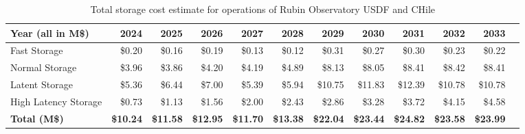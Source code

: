 \tiny \begin{longtable} { |p{}  |r  |r  |r  |r  |r  |r  |r  |r  |r  |r  |r |} 
\caption{Total storage cost estimate for operations of Rubin Observatory USDF and CHile \label{tab:opsStorageCost}}\\ 
\hline 
\textbf{Year (all in M\$)}&\textbf{2024}&\textbf{2025}&\textbf{2026}&\textbf{2027}&\textbf{2028}&\textbf{2029}&\textbf{2030}&\textbf{2031}&\textbf{2032}&\textbf{2033} \\ \hline
{Fast Storage}&{\$0.20}&{\$0.16}&{\$0.19}&{\$0.13}&{\$0.12}&{\$0.31}&{\$0.27}&{\$0.30}&{\$0.23}&{\$0.22} \\ \hline
{Normal Storage}&{\$3.96}&{\$3.86}&{\$4.20}&{\$4.19}&{\$4.89}&{\$8.13}&{\$8.05}&{\$8.41}&{\$8.42}&{\$8.41} \\ \hline
{Latent Storage}&{\$5.36}&{\$6.44}&{\$7.00}&{\$5.39}&{\$5.94}&{\$10.75}&{\$11.83}&{\$12.39}&{\$10.78}&{\$10.78} \\ \hline
{High Latency Storage}&{\$0.73}&{\$1.13}&{\$1.56}&{\$2.00}&{\$2.43}&{\$2.86}&{\$3.28}&{\$3.72}&{\$4.15}&{\$4.58} \\ \hline
\textbf{Total (M\$)}&\textbf{\$10.24}&\textbf{\$11.58}&\textbf{\$12.95}&\textbf{\$11.70}&\textbf{\$13.38}&\textbf{\$22.04}&\textbf{\$23.44}&\textbf{\$24.82}&\textbf{\$23.58}&\textbf{\$23.99} \\ \hline
\end{longtable} \normalsize
